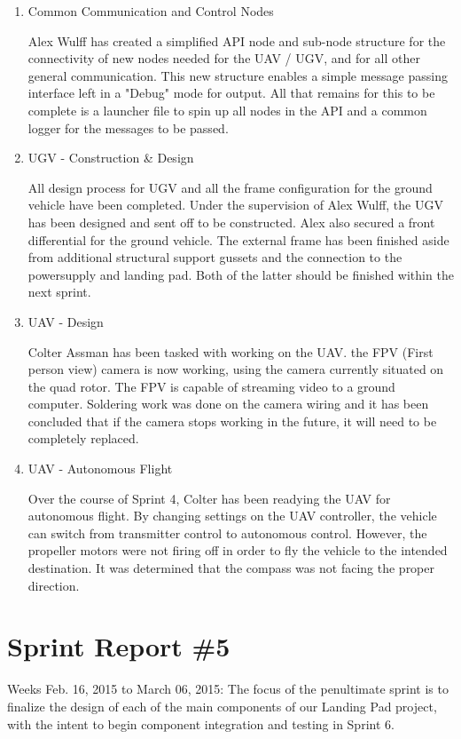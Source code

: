 \begin{enumerate}
\item Common Communication and Control Nodes

Alex Wulff has created a simplified API node and sub-node structure for the connectivity of new nodes needed for the UAV / UGV, and for all other general communication. This new structure enables a simple message passing interface left in a "Debug" mode for output. All that remains for this to be complete is a launcher file to spin up all nodes in the API and a common logger for the messages to be passed.

\item UGV - Construction \& Design

All design process for UGV and all the frame configuration for the ground vehicle have been completed.  Under the supervision of Alex Wulff, the UGV has been designed and sent off to be constructed. Alex also secured a front differential for the ground vehicle. The external frame has been finished aside from additional structural support gussets and the connection to the powersupply and landing pad.  Both of the latter should be finished within the next sprint.

\item UAV - Design

Colter Assman has been tasked with working on the UAV. the FPV (First person view) camera is now working, using the camera currently situated on the quad rotor. The FPV is capable of streaming video to a ground computer. Soldering work was done on the camera wiring and it has been concluded that if the camera stops working in the future, it will need to be completely replaced.

\item UAV - Autonomous Flight

Over the course of Sprint 4, Colter has been readying the UAV for autonomous flight. By changing settings on the UAV controller, the vehicle can switch from transmitter control to autonomous control. However, the propeller motors were not firing off in order to fly the vehicle to the intended destination. It was determined that the compass was not facing the proper direction.

\end{enumerate}
\section{Sprint Report \#5}
Weeks Feb. 16, 2015 to March 06, 2015:
The focus of the penultimate sprint is to finalize the design of each of the main components of our Landing Pad project, with the intent to begin component integration and testing in Sprint 6.

